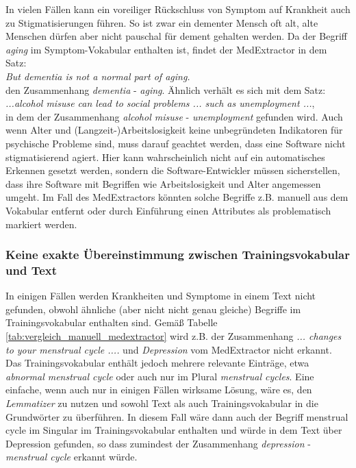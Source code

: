 In vielen Fällen kann ein voreiliger Rückschluss von Symptom auf Krankheit auch zu Stigmatisierungen führen. So ist zwar ein dementer Mensch oft alt, alte Menschen dürfen aber nicht pauschal für dement gehalten werden. Da der Begriff \emph{aging} im Symptom-Vokabular enthalten ist, findet der MedExtractor in dem Satz:\\

\emph{\glqq But dementia is not a normal part of aging.}\grqq\\

den Zusammenhang \emph{dementia} - \emph{aging}. Ähnlich verhält es sich mit dem Satz:\\

\emph{\glqq ...alcohol misuse can lead to social problems ... such as unemployment ...\grqq},\\

in dem der Zusammenhang \emph{alcohol misuse} - \emph{unemployment} gefunden wird. Auch wenn Alter und (Langzeit-)Arbeitslosigkeit keine unbegründeten Indikatoren für psychische Probleme sind, muss darauf geachtet werden, dass eine Software nicht stigmatisierend agiert. Hier kann wahrscheinlich nicht auf ein automatisches Erkennen gesetzt werden, sondern die Software-Entwickler müssen sicherstellen, dass ihre Software mit Begriffen wie Arbeitslosigkeit und Alter angemessen umgeht. Im Fall des MedExtractors könnten solche Begriffe z.B. manuell aus dem Vokabular entfernt oder durch Einführung einen Attributes als problematisch markiert werden.

\subsubsection{Keine exakte Übereinstimmung zwischen Trainingsvokabular und Text}
\label{subsec: nomatch} 

In einigen Fällen werden Krankheiten und Symptome in einem Text nicht gefunden, obwohl ähnliche (aber nicht nicht genau gleiche) Begriffe im Trainingsvokabular enthalten sind. Gemäß Tabelle \ref{tab:vergleich_manuell_medextractor} wird z.B. der Zusammenhang \emph{\glqq ... changes to your menstrual cycle ....\grqq} und \emph{Depression} vom MedExtractor nicht erkannt. Das Trainingsvokabular enthält jedoch mehrere relevante Einträge, etwa \emph{abnormal menstrual cycle} oder auch nur im Plural \emph{menstrual cycles}. Eine einfache, wenn auch nur in einigen Fällen wirksame Lösung, wäre es, den \emph{Lemmatizer} zu nutzen und sowohl Text als auch Trainingsvokabular in die Grundwörter zu überführen. In diesem Fall wäre dann auch der Begriff {menstrual cycle} im Singular im Trainingsvokabular enthalten und würde in dem Text über Depression gefunden, so dass zumindest der Zusammenhang \emph{depression} - \emph{menstrual cycle} erkannt würde.

